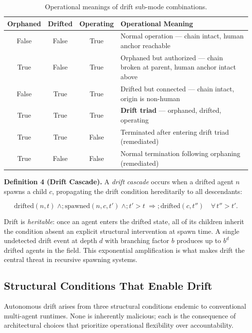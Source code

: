 \begin{table}[h]
\centering
\begin{tabular}{c|c|c|p{5cm}}
\textbf{Orphaned} & \textbf{Drifted} & \textbf{Operating} & \textbf{Operational Meaning} \\ \hline
False & False & True  & Normal operation — chain intact, human anchor reachable \\
True  & False & True  & Orphaned but authorized — chain broken at parent, human anchor intact above \\
False & True  & True  & Drifted but connected — chain intact, origin is non-human \\
True  & True  & True  & \textbf{Drift triad} — orphaned, drifted, operating \\
True  & True  & False & Terminated after entering drift triad (remediated) \\
True  & False & False & Normal termination following orphaning (remediated)
\end{tabular}
\caption{Operational meanings of drift sub-mode combinations.}
\label{tab:drift-submodes}
\end{table}

\medskip
\noindent\textbf{Definition 4 (Drift Cascade).}
A \emph{drift cascade} occurs when a drifted agent $n$ spawns a child $c$, propagating the drift condition hereditarily to all descendants:

\begin{equation}
\mathrm{drifted}(n, t) \;\land;\mathrm{spawned}(n, c, t') \;\land; t' > t \;\Longrightarrow;\mathrm{drifted}(c, t'')\quad \forall\, t'' > t'.
\label{eq:drift-cascade}
\end{equation}

Drift is \emph{heritable}: once an agent enters the drifted state, all of its children inherit the condition absent an explicit structural intervention at spawn time. A single undetected drift event at depth $d$ with branching factor $b$ produces up to $b^d$ drifted agents in the field. This exponential amplification is what makes drift the central threat in recursive spawning systems.

\subsection{Structural Conditions That Enable Drift}
\label{sec:drift-conditions}

Autonomous drift arises from three structural conditions endemic to conventional multi-agent runtimes. None is inherently malicious; each is the consequence of architectural choices that prioritize operational flexibility over accountability.

